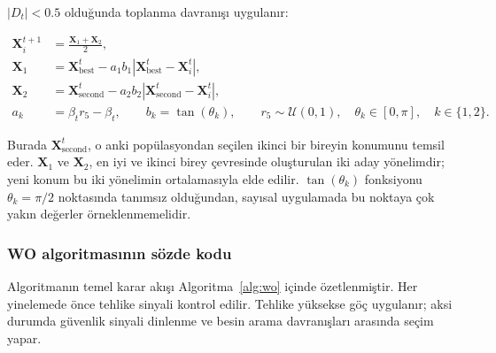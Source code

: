 $|D_t|<0.5$ olduğunda toplanma davranışı uygulanır:

\begin{align}
    \mathbf{X}_i^{t+1}
    &=
    \frac{\mathbf{X}_1+\mathbf{X}_2}{2},
    \label{eq:wo_gathering}\\
    \mathbf{X}_1
    &=
    \mathbf{X}_{\mathrm{best}}^t
    -a_1b_1
    \left|
        \mathbf{X}_{\mathrm{best}}^t-\mathbf{X}_i^t
    \right|,
    \label{eq:wo_gather_x1}\\
    \mathbf{X}_2
    &=
    \mathbf{X}_{\mathrm{second}}^t
    -a_2b_2
    \left|
        \mathbf{X}_{\mathrm{second}}^t-\mathbf{X}_i^t
    \right|,
    \label{eq:wo_gather_x2}\\
    a_k
    &=
    \beta_t r_5-\beta_t,
    \qquad
    b_k=\tan(\theta_k),
    \qquad
    r_5\sim\mathcal{U}(0,1),
    \quad
    \theta_k\in[0,\pi],
    \quad k\in\{1,2\}.
    \label{eq:wo_gather_coefficients}
\end{align}

Burada $\mathbf{X}_{\mathrm{second}}^t$, o anki popülasyondan seçilen
ikinci bir bireyin konumunu temsil eder. $\mathbf{X}_1$ ve
$\mathbf{X}_2$, en iyi ve ikinci birey çevresinde oluşturulan iki
aday yönelimdir; yeni konum bu iki yönelimin ortalamasıyla elde edilir.
$\tan(\theta_k)$ fonksiyonu $\theta_k=\pi/2$ noktasında tanımsız
olduğundan, sayısal uygulamada bu noktaya çok yakın değerler
örneklenmemelidir.

\subsubsection{WO algoritmasının sözde kodu}

Algoritmanın temel karar akışı Algoritma~\ref{alg:wo} içinde
özetlenmiştir. Her yinelemede önce tehlike sinyali kontrol edilir.
Tehlike yüksekse göç uygulanır; aksi durumda güvenlik sinyali dinlenme
ve besin arama davranışları arasında seçim yapar.

